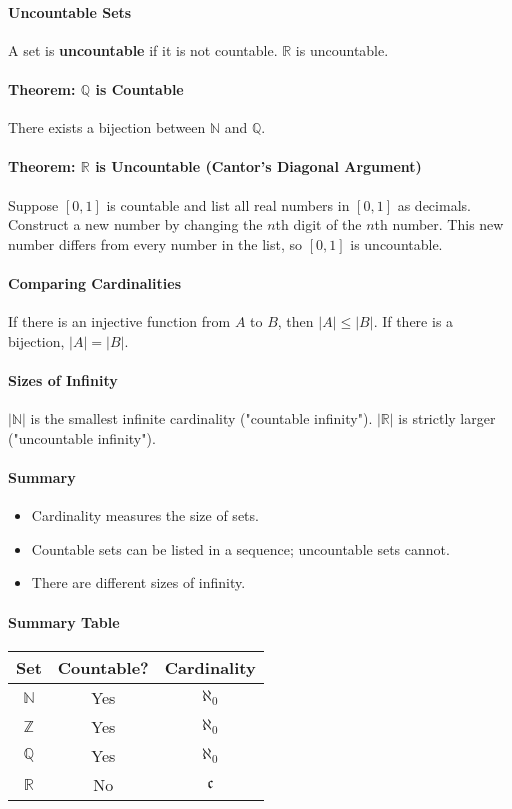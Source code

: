 \paragraph*{Uncountable Sets}
A set is \textbf{uncountable} if it is not countable. $\mathbb{R}$ is uncountable.

\paragraph*{Theorem: $\mathbb{Q}$ is Countable}
There exists a bijection between $\mathbb{N}$ and $\mathbb{Q}$.

\paragraph*{Theorem: $\mathbb{R}$ is Uncountable (Cantor's Diagonal Argument)}
Suppose $[0,1]$ is countable and list all real numbers in $[0,1]$ as decimals. Construct a new number by changing the $n$th digit of the $n$th number. This new number differs from every number in the list, so $[0,1]$ is uncountable.

\paragraph*{Comparing Cardinalities}
If there is an injective function from $A$ to $B$, then $|A| \leq |B|$. If there is a bijection, $|A| = |B|$.

\paragraph*{Sizes of Infinity}
$|\mathbb{N}|$ is the smallest infinite cardinality ("countable infinity"). $|\mathbb{R}|$ is strictly larger ("uncountable infinity").

\paragraph*{Summary}
\begin{itemize}
    \item Cardinality measures the size of sets.
    \item Countable sets can be listed in a sequence; uncountable sets cannot.
    \item There are different sizes of infinity.
\end{itemize}

\paragraph*{Summary Table}
\begin{center}
\begin{tabular}{|c|c|c|}
\hline
Set & Countable? & Cardinality \\
\hline
$\mathbb{N}$ & Yes & $\aleph_0$ \\
$\mathbb{Z}$ & Yes & $\aleph_0$ \\
$\mathbb{Q}$ & Yes & $\aleph_0$ \\
$\mathbb{R}$ & No & $\mathfrak{c}$ \\
\hline
\end{tabular}
\end{center}
